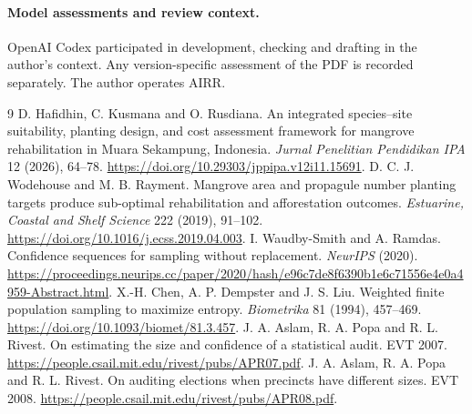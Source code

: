 \documentclass[10pt]{article}
\begin{document}
\paragraph{Model assessments and review context.} OpenAI Codex participated in development, checking and drafting in the author's context. Any version-specific assessment of the PDF is recorded separately. The author operates AIRR.
\begin{thebibliography}{9}
 D. Hafidhin, C. Kusmana and O. Rusdiana. An integrated species--site suitability, planting design, and cost assessment framework for mangrove rehabilitation in Muara Sekampung, Indonesia. \emph{Jurnal Penelitian Pendidikan IPA} 12 (2026), 64--78. \url{https://doi.org/10.29303/jppipa.v12i11.15691}.
 D. C. J. Wodehouse and M. B. Rayment. Mangrove area and propagule number planting targets produce sub-optimal rehabilitation and afforestation outcomes. \emph{Estuarine, Coastal and Shelf Science} 222 (2019), 91--102. \url{https://doi.org/10.1016/j.ecss.2019.04.003}.
 I. Waudby-Smith and A. Ramdas. Confidence sequences for sampling without replacement. \emph{NeurIPS} (2020). \url{https://proceedings.neurips.cc/paper/2020/hash/e96c7de8f6390b1e6c71556e4e0a4959-Abstract.html}.
 X.-H. Chen, A. P. Dempster and J. S. Liu. Weighted finite population sampling to maximize entropy. \emph{Biometrika} 81 (1994), 457--469. \url{https://doi.org/10.1093/biomet/81.3.457}.
 J. A. Aslam, R. A. Popa and R. L. Rivest. On estimating the size and confidence of a statistical audit. EVT 2007. \url{https://people.csail.mit.edu/rivest/pubs/APR07.pdf}.
 J. A. Aslam, R. A. Popa and R. L. Rivest. On auditing elections when precincts have different sizes. EVT 2008. \url{https://people.csail.mit.edu/rivest/pubs/APR08.pdf}.
\end{thebibliography}
\end{document}
